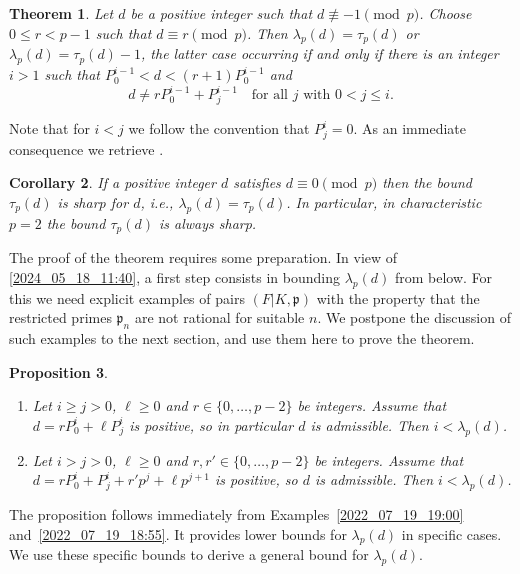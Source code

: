 \documentclass[12pt,reqno]{amsart}%
\newtheorem{prop}{Proposition}[section]
\newtheorem{thm}[prop]{Theorem}
\newtheorem{cor}[prop]{Corollary}
\theoremstyle{definition}
\theoremstyle{remark}
\newcommand{\pp}{\mathfrak{p}}
\newcommand{\lam}{\lambda}
\begin{document}
\begin{thm}\label{2022_07_24_00:25}
Let $d$ be a positive integer such that $d \not\equiv -1 \pmod p$.
Choose $0\leq r < p-1$ such that $d\equiv r \pmod p$.
Then $\lam_p(d)=\tau_p(d)$ or $\lam_p(d)=\tau_p(d)-1$,
the latter case occurring
if and only if 
there is an integer $i>1$ such that 
$P_0^{i-1} < d < (r+1) P_0^{i-1}$ and
\[ d\neq r P_0^{i-1} + P_j^{i-1} \quad \text{for all $j$ with $0<j\leq i$}.\]
\end{thm}

Note that for $i<j$ we follow the convention that $P_j^i = 0$.
As an immediate consequence we retrieve \cite[Proposition~2.25]{HiSt22}.

\begin{cor}%
If a positive integer $d$ satisfies $d\equiv 0 \pmod p$ then the bound $\tau_p(d)$ is sharp for $d$, i.e., $\lam_p(d) = \tau_p(d)$.
In particular, in characteristic $p=2$
the bound $\tau_p(d)$ is always sharp.
\end{cor}

The proof of the theorem requires some preparation. 
In view of \eqref{2024_05_18_11:40}, a first step consists in bounding $\lam_p(d)$ from below.
For this we need explicit examples of pairs $(F|K,\pp)$ with the property that the restricted primes $\pp_n$ are not rational for suitable $n$.
We postpone the discussion of such examples to the next section, and use them here to prove the theorem.

\begin{prop}\label{2025_12_10_12:40}
$ $
\begin{enumerate}[\upshape (i)]
    \item \label{2025_12_10_12:41}
    Let $i\geq j>0$, $\ell\geq 0$ and $r\in\{0,\dots,p-2\}$ be integers. Assume that $d = r P_0^i + \ell P_j^i$ is positive, so in particular $d$ is admissible. Then $i<\lam_p(d)$.
    \item \label{2025_12_10_12:42}
    Let $i > j>0$, $\ell\geq 0$ and $r,r'\in\{0,\dots,p-2\}$ be integers. Assume that     $d = r P_0^i + P_j^i + r' p^j + \ell p^{j+1}$ is positive, so $d$ is admissible. Then $i<\lam_p(d)$.
\end{enumerate}
\end{prop}

The proposition follows immediately from Examples~\ref{2022_07_19_19:00} and~\ref{2022_07_19_18:55}.
It provides lower bounds for $\lam_p(d)$ in specific cases.
We use these specific bounds to derive a general bound for $\lam_p(d)$.
\end{document}
